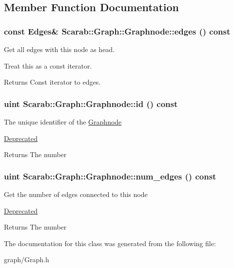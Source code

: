 \subsection{Member Function Documentation}
\hypertarget{classScarab_1_1Graph_1_1Graphnode_a4ffd990052c812242cbdeeae7b0e1104}{
\subsubsection[{edges}]{\setlength{\rightskip}{0pt plus 5cm}const Edges\& Scarab::Graph::Graphnode::edges () const}}
\label{classScarab_1_1Graph_1_1Graphnode_a4ffd990052c812242cbdeeae7b0e1104}
Get all edges with this node as head.

Treat this as a const iterator. \begin{DoxyReturn}{Returns}
Const iterator to edges. 
\end{DoxyReturn}
\hypertarget{classScarab_1_1Graph_1_1Graphnode_a74eaaed5d31a0a2c0445f3de0859148f}{
\subsubsection[{id}]{\setlength{\rightskip}{0pt plus 5cm}uint Scarab::Graph::Graphnode::id () const}}
\label{classScarab_1_1Graph_1_1Graphnode_a74eaaed5d31a0a2c0445f3de0859148f}
The unique identifier of the \hyperlink{classScarab_1_1Graph_1_1Graphnode}{Graphnode} \begin{Desc}
\item[\hyperlink{deprecated__deprecated000001}{Deprecated}]\end{Desc}
\begin{DoxyReturn}{Returns}
The number 
\end{DoxyReturn}
\hypertarget{classScarab_1_1Graph_1_1Graphnode_a78229cc45113d24f1373a50a13bc7be4}{
\subsubsection[{num\_\-edges}]{\setlength{\rightskip}{0pt plus 5cm}uint Scarab::Graph::Graphnode::num\_\-edges () const}}
\label{classScarab_1_1Graph_1_1Graphnode_a78229cc45113d24f1373a50a13bc7be4}
Get the number of edges connected to this node \begin{Desc}
\item[\hyperlink{deprecated__deprecated000002}{Deprecated}]\end{Desc}
\begin{DoxyReturn}{Returns}
The number 
\end{DoxyReturn}


The documentation for this class was generated from the following file:\begin{DoxyCompactItemize}
\item 
graph/Graph.h\end{DoxyCompactItemize}

